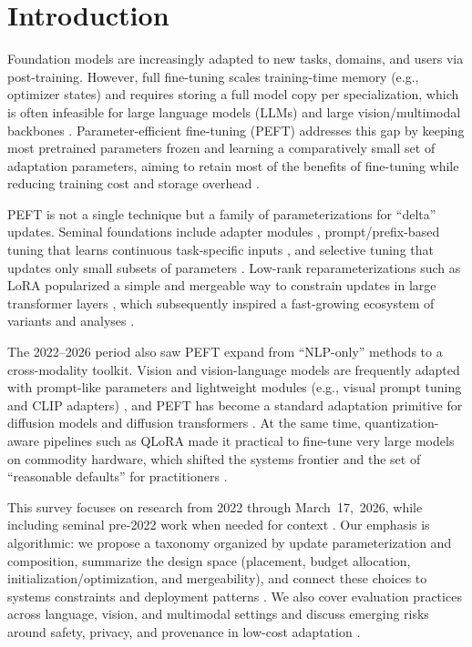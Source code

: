 \documentclass[conference]{IEEEtran}
\begin{document}
\section{Introduction}
Foundation models are increasingly adapted to new tasks, domains, and users via post-training. However, full fine-tuning scales training-time memory (e.g., optimizer states) and requires storing a full model copy per specialization, which is often infeasible for large language models (LLMs) and large vision/multimodal backbones \cite{han2024parameter,wang2024parameter,prottasha2025peft}. Parameter-efficient fine-tuning (PEFT) addresses this gap by keeping most pretrained parameters frozen and learning a comparatively small set of adaptation parameters, aiming to retain most of the benefits of fine-tuning while reducing training cost and storage overhead \cite{zhang2025parameter,han2024parameter}.

PEFT is not a single technique but a family of parameterizations for ``delta'' updates. Seminal foundations include adapter modules \cite{houlsby2019parameter,pfeiffer2020adapterhub}, prompt/prefix-based tuning that learns continuous task-specific inputs \cite{li2021prefix,lester2021the,liu2021p}, and selective tuning that updates only small subsets of parameters \cite{benzaken2021bitfit,liu2022few}. Low-rank reparameterizations such as LoRA popularized a simple and mergeable way to constrain updates in large transformer layers \cite{hu2021lora}, which subsequently inspired a fast-growing ecosystem of variants and analyses \cite{zhang2023adalora,liu2024dora,wang2024lora,hu2024computational}.

The 2022--2026 period also saw PEFT expand from ``NLP-only'' methods to a cross-modality toolkit. Vision and vision-language models are frequently adapted with prompt-like parameters and lightweight modules (e.g., visual prompt tuning and CLIP adapters) \cite{jia2022visual,zhang2021tip,radford2021learning}, and PEFT has become a standard adaptation primitive for diffusion models and diffusion transformers \cite{rombach2021high,ho2020denoising,huang2024in}. At the same time, quantization-aware pipelines such as QLoRA made it practical to fine-tune very large models on commodity hardware, which shifted the systems frontier and the set of ``reasonable defaults'' for practitioners \cite{dettmers2023qlora,han2024parameter}.

This survey focuses on research from 2022 through March~17,~2026, while including seminal pre-2022 work when needed for context \cite{han2024parameter,wang2024parameter}. Our emphasis is algorithmic: we propose a taxonomy organized by update parameterization and composition, summarize the design space (placement, budget allocation, initialization/optimization, and mergeability), and connect these choices to systems constraints and deployment patterns \cite{chen2023parameter,si2024see}. We also cover evaluation practices across language, vision, and multimodal settings and discuss emerging risks around safety, privacy, and provenance in low-cost adaptation \cite{taraghi2025efficiency,wang2025stolenlora}.
\end{document}
